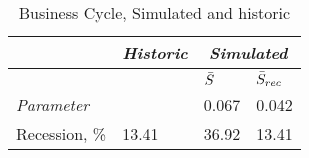 \begin{table}[H] 
\centering
\caption{Business Cycle, Simulated and historic}
\label{tab:BC}
\begin{tabular}{@{}llll@{}}
\toprule
              & \textit{Historic} & \multicolumn{2}{c}{\textit{Simulated}} \\ \midrule
                       &                   & $\Bar{S}$       & $\Bar{S}_{rec}$      \\ \cmidrule(l){3-4} 
\textit{Parameter}     &                   & 0.067&0.042              \\
Recession, \% &13.41&36.92 &13.41\\ \bottomrule
\end{tabular}
\end{table}
